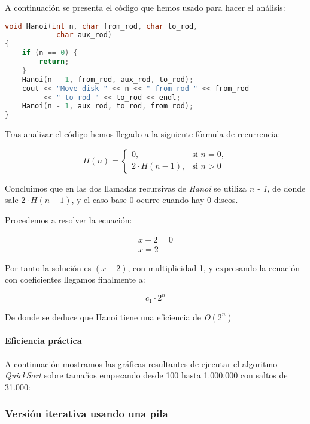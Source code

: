 \documentclass[a4paper,12pt]{article} %
\begin{document}
A continuación se presenta el código que hemos usado para hacer el análisis:

\begin{lstlisting}[language=C, caption={Código de Hanoi}]
void Hanoi(int n, char from_rod, char to_rod,
            char aux_rod)
{
    if (n == 0) {
        return;
    }
    Hanoi(n - 1, from_rod, aux_rod, to_rod);
    cout << "Move disk " << n << " from rod " << from_rod
         << " to rod " << to_rod << endl;
    Hanoi(n - 1, aux_rod, to_rod, from_rod);
}
\end{lstlisting}

Tras analizar el código hemos llegado a la siguiente fórmula de recurrencia:

\[
H(n)=
\begin{cases}
0,  & \text{si } n = 0,\\[6pt]
2\cdot H(n-1), & \text{si } n > 0
\end{cases}
\]

Concluimos que en las dos llamadas recursivas de \textit{Hanoi}
se utiliza \textit{n - 1}, de donde sale $2\cdot H(n-1)$, y el caso base 
0 ocurre cuando hay 0 discos.

Procedemos a resolver la ecuación:

\begin{align*}
	x - 2 = 0 \\
	x = 2
\end{align*}

Por tanto la solución es $(x -2)$, con multiplicidad 1, y expresando la 
ecuación con coeficientes llegamos finalmente a:

\begin{equation*}
	c_{1}\cdot 2^{n}
\end{equation*}

De donde se deduce que Hanoi tiene una eficiencia de \textit{O}$(2^{n})$

\paragraph{Eficiencia práctica}

A continuación mostramos las gráficas resultantes de ejecutar el algoritmo \textit{QuickSort} 
sobre tamaños empezando desde 100 hasta 1.000.000 con saltos de 31.000:

\subsubsection{Versión iterativa usando una pila}
\end{document}
